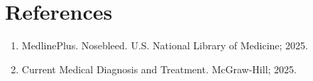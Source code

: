 \section*{References}
\begin{enumerate}
  \item MedlinePlus. Nosebleed. U.S. National Library of Medicine; 2025.
  \item Current Medical Diagnosis and Treatment. McGraw-Hill; 2025.
\end{enumerate}

\clearpage
